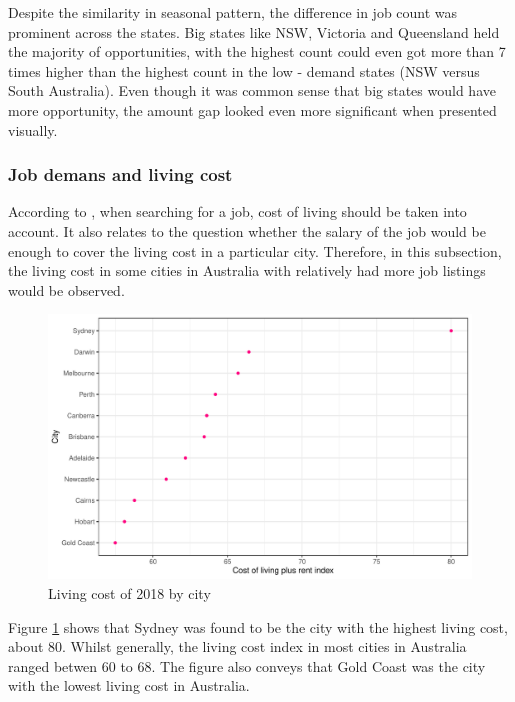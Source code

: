 \documentclass[11pt,a4paper,]{article}
\begin{document}
Despite the similarity in seasonal pattern, the difference in job count was prominent across the states. Big states like NSW, Victoria and Queensland held the majority of opportunities, with the highest count could even got more than 7 times higher than the highest count in the low - demand states (NSW versus South Australia). Even though it was common sense that big states would have more opportunity, the amount gap looked even more significant when presented visually.

\hypertarget{job-demans-and-living-cost}{%
\subsubsection{Job demans and living cost}\label{job-demans-and-living-cost}}

According to \textcite{davidlasswell}, when searching for a job, cost of living should be taken into account. It also relates to the question whether the salary of the job would be enough to cover the living cost in a particular city. Therefore, in this subsection, the living cost in some cities in Australia with relatively had more job listings would be observed.

\begin{figure}
\centering
\includegraphics{Team_JHDP_Assignment4_files/figure-latex/livingcostplot-1.pdf}
\caption{\label{fig:livingcostplot}Living cost of 2018 by city}
\end{figure}

Figure \ref{fig:livingcostplot} shows that Sydney was found to be the city with the highest living cost, about 80. Whilst generally, the living cost index in most cities in Australia ranged betwen 60 to 68. The figure also conveys that Gold Coast was the city with the lowest living cost in Australia.
\end{document}
